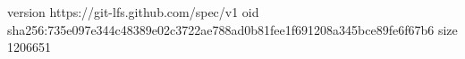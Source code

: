 version https://git-lfs.github.com/spec/v1
oid sha256:735e097e344c48389e02c3722ae788ad0b81fee1f691208a345bce89fe6f67b6
size 1206651
